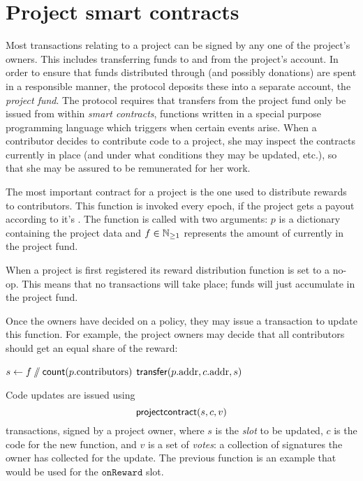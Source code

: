 \section{Project smart contracts}
\label{s:smart-contracts}

Most transactions relating to a project can be signed by any one of the
project's owners. This includes transferring funds to and from the project's
account. In order to ensure that funds distributed through \osrank{} (and
possibly donations) are spent in a responsible manner, the protocol deposits
these into a separate account, the \emph{project fund}. The protocol requires
that transfers from the project fund only be issued from within \emph{smart
  contracts}, functions written in a special purpose programming language which
triggers when certain events arise. When a contributor decides to contribute
code to a project, she may inspect the contracts currently in place (and under
what conditions they may be updated, etc.), so that she may be assured to be
remunerated for her work.

The most important contract for a project is the one used to distribute rewards
to contributors. This function is invoked every epoch, if the project gets a
payout according to it's \osrank{}. The function is called with two arguments:
$p$ is a dictionary containing the project data and $f \in \mathbb{N}_{\geq 1}$ represents
the amount of \oscoin{} currently in the project fund.

When a project is first registered its reward distribution function is set to a
no-op. This means that no transactions will take place; funds will just
accumulate in the project fund.

Once the owners have decided on a policy, they may issue a transaction to update
this function. For example, the project owners may decide that all contributors
should get an equal share of the reward:

\begin{algorithmic}[1]
\State $s \gets f \sslash \mathsf{count}(p.{\mathrm{contributors}})$
  \State $\mathsf{transfer}\small{\lparen p.{\mathrm{addr}}, c.{\mathrm{addr}}, s\rparen}$
\EndFor
\EndProcedure
\end{algorithmic}

Code updates are issued using
\[
    \mathsf{projectcontract}\small{\lparen s, c, v\rparen}
\]
transactions, signed by a project owner, where $s$ is the \emph{slot} to be
updated, $c$ is the code for the new function, and $v$ is a set of \emph{votes}:
a collection of signatures the owner has collected for the update. The previous
function is an example that would be used for the $\mathtt{onReward}$ slot.

